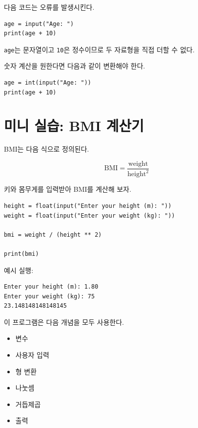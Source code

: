 \documentclass[11pt,a4paper]{article}
\begin{document}
다음 코드는 오류를 발생시킨다.

\begin{lstlisting}
age = input("Age: ")
print(age + 10)
\end{lstlisting}

\texttt{age}는 문자열이고 \texttt{10}은 정수이므로 두 자료형을 직접 더할 수 없다.

숫자 계산을 원한다면 다음과 같이 변환해야 한다.

\begin{lstlisting}
age = int(input("Age: "))
print(age + 10)
\end{lstlisting}

\section{미니 실습: BMI 계산기}

BMI는 다음 식으로 정의된다.

\[
\mathrm{BMI}
=
\frac{\mathrm{weight}}{\mathrm{height}^{2}}
\]

키와 몸무게를 입력받아 BMI를 계산해 보자.

\begin{lstlisting}
height = float(input("Enter your height (m): "))
weight = float(input("Enter your weight (kg): "))

bmi = weight / (height ** 2)

print(bmi)
\end{lstlisting}

예시 실행:

\begin{verbatim}
Enter your height (m): 1.80
Enter your weight (kg): 75
23.148148148148145
\end{verbatim}

\begin{practicebox}
이 프로그램은 다음 개념을 모두 사용한다.
\begin{itemize}[leftmargin=1.5em]
    \item 변수
    \item 사용자 입력
    \item 형 변환
    \item 나눗셈
    \item 거듭제곱
    \item 출력
\end{itemize}
\end{practicebox}
\end{document}
